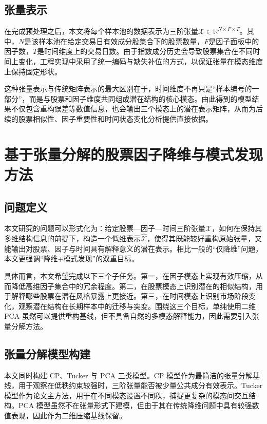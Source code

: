 \section{张量表示}

在完成预处理之后，本文将每个样本池的数据表示为三阶张量$\mathcal{X}\in\mathbb{R}^{N\times F\times T}$。其中，$N$是该样本池在给定交易日有效成分股集合下的股票数量，$F$是因子面板中的因子数，$T$是时间维度上的交易日数。由于指数成分历史会导致股票集合在不同时间上变化，工程实现中采用了统一编码与缺失补位的方式，以保证张量在模态维度上保持固定形状。

这种张量表示与传统矩阵表示的最大区别在于，时间维度不再只是“样本编号的一部分”，而是与股票和因子维度共同组成潜在结构的核心模态。由此得到的模型结果不仅包含重构误差等数值信息，也会输出三个模态上的潜在表示矩阵，从而为后续的股票相似性、因子重要性和时间状态变化分析提供直接依据。

\chapter{基于张量分解的股票因子降维与模式发现方法}

\section{问题定义}

本文研究的问题可以形式化为：给定股票—因子—时间三阶张量$\mathcal{X}$，如何在保持其多维结构信息的前提下，构造一个低维表示$\hat{\mathcal{X}}$，使得其既能较好重构原始张量，又能输出对股票、因子与时间具有解释意义的潜在表示。相比一般的“仅降维”问题，本文更强调“降维+模式发现”的双重目标。

具体而言，本文希望完成以下三个子任务。第一，在因子模态上实现有效压缩，从而降低高维因子集合中的冗余程度。第二，在股票模态上识别潜在的相似结构，用于解释哪些股票在潜在风格暴露上更接近。第三，在时间模态上识别市场阶段变化，观察潜在结构在长期样本中的迁移与突变。围绕这三个目标，单纯使用二维 PCA 虽然可以提供重构基线，但不具备自然的多模态解释能力，因此需要引入张量分解方法。

\section{张量分解模型构建}

本文同时构建 CP、Tucker 与 PCA 三类模型。CP 模型作为最简洁的张量分解基线，用于观察在低秩约束较强时，三阶张量能否被少量公共成分有效表示。Tucker 模型作为论文主方法，用于在不同模态设置不同秩，捕捉更复杂的模态间交互结构。PCA 模型虽然不在张量形式下建模，但由于其在传统降维问题中具有较强数值表现，因此作为二维压缩基线保留。

